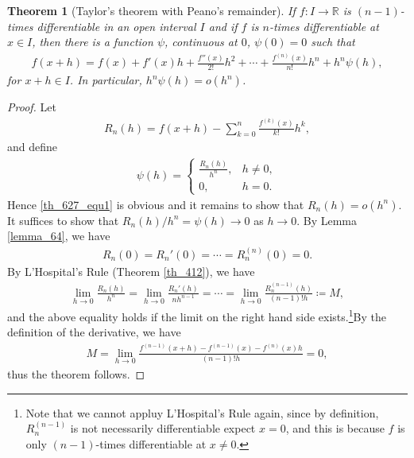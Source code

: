 \documentclass[10pt]{book}
\newtheorem{theorem}{Theorem}[chapter]
\theoremstyle{definition}
\numberwithin{equation}{chapter}
\begin{document}
\medskip

\begin{theorem}[Taylor's theorem with Peano's remainder]\label{th_627}
If $f: I \to \mathbb{R}$ is $(n-1)$-times differentiable in an open interval $I$ and if $f$ is $n$-times differentiable at $x \in I$, then there is a function $\psi$, continuous at $0$, $\psi(0) = 0$ such that
\begin{align}\label{th_627_equ1}
    f(x + h) = f(x) + f'(x)h + \frac{f''(x)}{2!}h^2 + \cdots + \frac{f^{(n)}(x)}{n!}h^n + h^n \psi(h),
\end{align}
for $x + h \in I$. In particular, $h^n \psi(h) = o(h^n)$.
\end{theorem}
\begin{proof}
Let
\begin{align*}
    R_n(h) = f(x + h) - \sum^n_{k=0} \frac{f^{(k)}(x)}{k!} h^k,
\end{align*}
and define
\begin{align*}
    \psi(h) = \begin{cases}
        \frac{R_n(h)}{h^n}, & h \neq 0, \\
        0, & h = 0.
    \end{cases}
\end{align*}
Hence \eqref{th_627_equ1} is obvious and it remains to show that $R_n(h) = o(h^n)$. It suffices to show that $R_n(h)/h^n = \psi(h) \to 0$ as $h \to 0$. By Lemma \ref{lemma_64}, we have
\begin{align*}
    R_n(0) = R_n'(0) = \cdots = R_n^{(n)}(0) = 0.
\end{align*}
By L'Hospital's Rule (Theorem \ref{th_412}), we have
\begin{align*}
    \lim_{h \to 0} \frac{R_n(h)}{h^n} = \lim_{h \to 0} \frac{R_n'(h)}{nh^{n-1}} = \cdots = \lim_{h \to 0} \frac{R_n^{(n-1)}(h)}{(n-1)!h} \coloneqq M,
\end{align*}
and the above equality holds if the limit on the right hand side exists.\footnote{Note that we cannot appluy L'Hospital's Rule again, since by definition, $R_n^{(n-1)}$ is not necessarily differentiable expect $x = 0$, and this is because $f$ is only $(n-1)$-times differentiable at $x \neq 0$.}By the definition of the derivative, we have
\begin{align*}
    M = \lim_{h \to 0} \frac{f^{(n-1)}(x+h) - f^{(n-1)}(x) - f^{(n)}(x)h}{(n-1)!h} = 0,
\end{align*}
thus the theorem follows.
\end{proof}

\medskip
\end{document}
